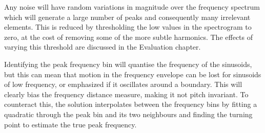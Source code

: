 \documentclass[12pt,a4paper,twoside,openright]{report}
\begin{document}
{Any noise will have random variations in magnitude over the frequency spectrum which will generate a large number of peaks and consequently many irrelevant elements. This is reduced by thresholding the low values in the spectrogram to zero, at the cost of removing some of the more subtle harmonics. The effects of varying this threshold are discussed in the Evaluation chapter.}


Identifying the peak frequency bin will quantise the frequency of the sinusoids, but this can mean that motion in the frequency envelope can be lost for sinusoids of low frequency, or emphasized if it oscillates around a boundary. This will clearly bias the frequency distance measure, making it not pitch invariant. To counteract this, the solution interpolates between the frequency bins by fitting a quadratic through the peak bin and its two neighbours and finding the turning point to estimate the true peak frequency.

\end{document}
